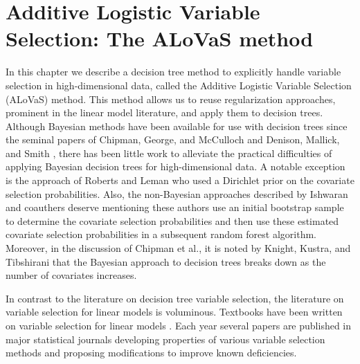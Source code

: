 \chapter{Additive Logistic Variable Selection: The ALoVaS method}\label{sec:Introduction}

In this chapter we describe a decision tree method to explicitly handle variable selection in high-dimensional data, called the Additive Logistic Variable Selection  (ALoVaS) method. This method allows us to reuse regularization approaches, prominent in the linear model literature, and apply them to decision trees. Although Bayesian methods have been available for use with decision trees since the seminal papers of Chipman, George, and McCulloch \cite{chipman1998bayesian}  and Denison, Mallick, and Smith \cite{denison1998bayesian}, there has been little work to alleviate the practical difficulties of applying Bayesian decision trees for high-dimensional data. A notable exception is the approach of Roberts and Leman \cite{Roberts:2013uq} who used a Dirichlet prior on the covariate selection probabilities. Also, the non-Bayesian approaches described by Ishwaran and coauthers \cite{ishwaran2011random,ishwaran2010high,ishwaran2007variable} deserve mentioning these authors use an initial bootstrap sample to determine the covariate selection probabilities and then use these estimated covariate selection probabilities in a subsequent random forest algorithm. Moreover, in the discussion of Chipman et al., it is noted by Knight, Kustra, and Tibshirani \cite{knight1998bayesian} that the Bayesian approach to decision trees breaks down as the number of covariates increases. 

In contrast to the literature on decision tree variable selection, the literature on variable selection for linear models is voluminous. Textbooks have been written on variable selection for linear models \cite{miller2002subset}. Each year several papers are published in major statistical journals developing properties of various variable selection methods and proposing modifications to improve known deficiencies. 

